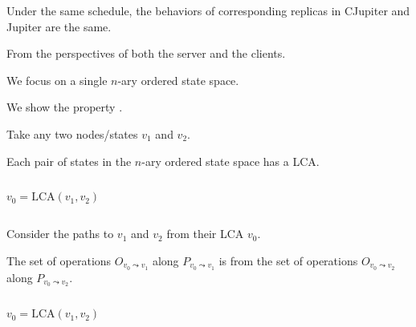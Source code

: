 \begin{frame}{}
  \begin{Theorem}
    Under the same schedule, the behaviors of corresponding replicas in CJupiter and Jupiter are the same.
  \end{Theorem}

  \vspace{1.0cm}
  \centerline{\large From the perspectives of both the server and the clients.}
\end{frame}
\begin{frame}{}
  \begin{center}
    {\large We focus on a single $n$-ary ordered state space.}
  \end{center}


  \begin{center}
    {\large We show the  property .}
  \end{center}
\end{frame}

\begin{frame}{}
  \centerline{ Take any two nodes/states $v_1$ and $v_2$.}

  \begin{lemma}
    Each pair of states in the $n$-ary ordered state space has a  LCA.
  \end{lemma}

  \begin{columns}
	\[
	  v_0 = \text{LCA}(v_1, v_2)
	\]
  \end{columns}
\end{frame}

\begin{frame}{}
  \centerline{ Consider the paths to $v_1$ and $v_2$ from their LCA $v_0$.}

  \begin{lemma}
    The set of operations $O_{v_0 \leadsto v_1}$ along $P_{v_0 \leadsto v_1}$ 
    is  from the set of operations $O_{v_0 \leadsto v_2}$ along $P_{v_0 \leadsto v_2}$.
  \end{lemma}

  \begin{columns}
	\[
	  v_0 = \text{LCA}(v_1, v_2)
	\]
  \end{columns}
\end{frame}

